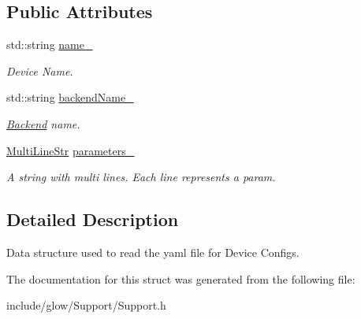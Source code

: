 \subsection*{Public Attributes}
\begin{DoxyCompactItemize}
\item 
\mbox{\label{structglow_1_1_device_config_helper_a58e612f166c896d3e580b16ac642288a}} 
std\+::string \hyperlink{structglow_1_1_device_config_helper_a58e612f166c896d3e580b16ac642288a}{name\+\_\+}
\begin{DoxyCompactList}\small\item\em Device Name. \end{DoxyCompactList}\item 
\mbox{\label{structglow_1_1_device_config_helper_a504268fab5c818b13277fc878343c63b}} 
std\+::string \hyperlink{structglow_1_1_device_config_helper_a504268fab5c818b13277fc878343c63b}{backend\+Name\+\_\+}
\begin{DoxyCompactList}\small\item\em \hyperlink{classglow_1_1_backend}{Backend} name. \end{DoxyCompactList}\item 
\mbox{\label{structglow_1_1_device_config_helper_afdcb6777fa88ff5eb90c6b189d34409d}} 
\hyperlink{structglow_1_1_multi_line_str}{Multi\+Line\+Str} \hyperlink{structglow_1_1_device_config_helper_afdcb6777fa88ff5eb90c6b189d34409d}{parameters\+\_\+}
\begin{DoxyCompactList}\small\item\em A string with multi lines. Each line represents a param. \end{DoxyCompactList}\end{DoxyCompactItemize}


\subsection{Detailed Description}
Data structure used to read the yaml file for Device Configs. 

The documentation for this struct was generated from the following file\+:\begin{DoxyCompactItemize}
\item 
include/glow/\+Support/Support.\+h\end{DoxyCompactItemize}
